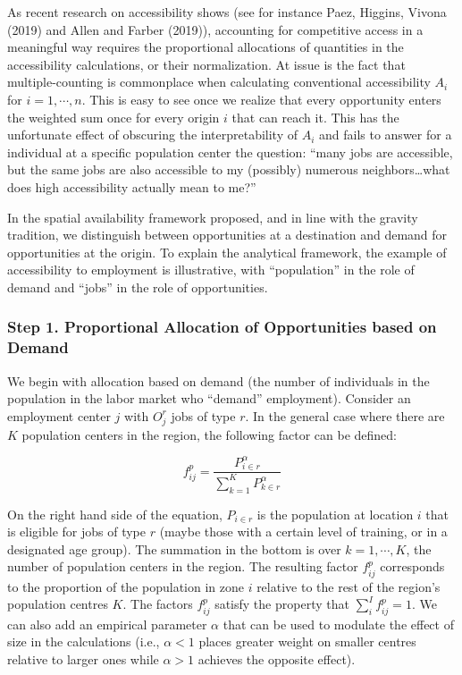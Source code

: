 \documentclass[]{elsarticle} %
\begin{document}
As recent research on accessibility shows (see for instance Paez,
Higgins, Vivona (2019) and Allen and Farber (2019)), accounting for
competitive access in a meaningful way requires the proportional
allocations of quantities in the accessibility calculations, or their
normalization. At issue is the fact that multiple-counting is
commonplace when calculating conventional accessibility \(A_i\) for
\(i=1,\cdots,n\). This is easy to see once we realize that every
opportunity enters the weighted sum once for every origin \(i\) that can
reach it. This has the unfortunate effect of obscuring the
interpretability of \(A_i\) and fails to answer for a individual at a
specific population center the question: ``many jobs are accessible, but
the same jobs are also accessible to my (possibly) numerous
neighbors\ldots what does high accessibility actually mean to me?''

In the spatial availability framework proposed, and in line with the
gravity tradition, we distinguish between opportunities at a destination
and demand for opportunities at the origin. To explain the analytical
framework, the example of accessibility to employment is illustrative,
with ``population'' in the role of demand and ``jobs'' in the role of
opportunities.

\hypertarget{step-1.-proportional-allocation-of-opportunities-based-on-demand}{%
\subsubsection{Step 1. Proportional Allocation of Opportunities based on
Demand}\label{step-1.-proportional-allocation-of-opportunities-based-on-demand}}

We begin with allocation based on demand (the number of individuals in
the population in the labor market who ``demand'' employment). Consider
an employment center \(j\) with \(O_j^r\) jobs of type \(r\). In the
general case where there are \(K\) population centers in the region, the
following factor can be defined:

\[
f^p_{ij} = \frac{P_{i\in r}^\alpha}{\sum_{k=1}^K P_{k\in r}^\alpha}
\]

\noindent On the right hand side of the equation, \(P_{i\in r}\) is the
population at location \(i\) that is eligible for jobs of type \(r\)
(maybe those with a certain level of training, or in a designated age
group). The summation in the bottom is over \(k=1,\cdots,K\), the number
of population centers in the region. The resulting factor \(f^p_{ij}\)
corresponds to the proportion of the population in zone \(i\) relative
to the rest of the region's population centres \(K\). The factors
\(f^p_{ij}\) satisfy the property that \(\sum_i^{I} f^p_{ij} = 1\). We
can also add an empirical parameter \(\alpha\) that can be used to
modulate the effect of size in the calculations (i.e., \(\alpha <1\)
places greater weight on smaller centres relative to larger ones while
\(\alpha>1\) achieves the opposite effect).
\end{document}
